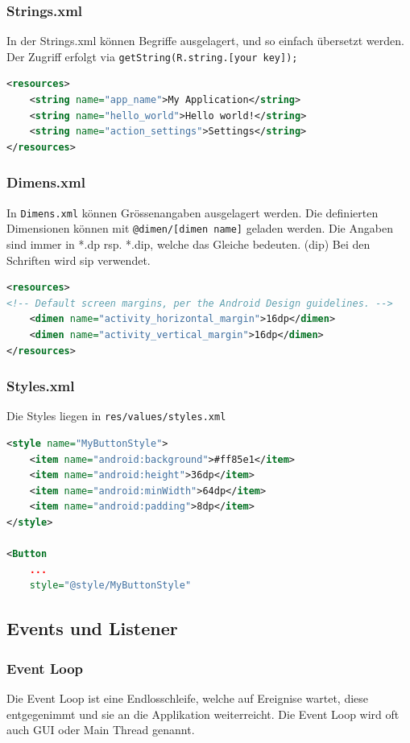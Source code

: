 \subsubsection{Strings.xml}
In der Strings.xml können Begriffe ausgelagert, und so einfach übersetzt werden. Der Zugriff erfolgt via \lstinline|getString(R.string.[your key]);|

\begin{lstlisting}[caption=strings.xml,language=xml]
<resources>
	<string name="app_name">My Application</string>
	<string name="hello_world">Hello world!</string>
	<string name="action_settings">Settings</string>
</resources>
\end{lstlisting}

\subsubsection{Dimens.xml}
In \lstinline|Dimens.xml| können Grössenangaben ausgelagert werden. Die definierten Dimensionen können mit \lstinline|@dimen/[dimen name]| geladen werden. Die Angaben sind immer in *.dp rsp. *.dip, welche das Gleiche bedeuten. (\gls{dip}) Bei den Schriften wird \gls{sip} verwendet.
\begin{lstlisting}[caption=dimens.xml, language=xml]
<resources>
<!-- Default screen margins, per the Android Design guidelines. -->
	<dimen name="activity_horizontal_margin">16dp</dimen>
	<dimen name="activity_vertical_margin">16dp</dimen>
</resources>
\end{lstlisting}

\subsubsection{Styles.xml}
Die Styles liegen in \lstinline|res/values/styles.xml|
\begin{lstlisting}[caption=styles.xml, language=xml]
<style name="MyButtonStyle">
	<item name="android:background">#ff85e1</item>
	<item name="android:height">36dp</item>
	<item name="android:minWidth">64dp</item>
	<item name="android:padding">8dp</item>
</style>

<Button
	...
	style="@style/MyButtonStyle"
\end{lstlisting}

\subsection{Events und Listener}
\subsubsection{Event Loop}
Die Event Loop ist eine Endlosschleife, welche auf Ereignise wartet, diese entgegenimmt und sie an die Applikation weiterreicht. Die Event Loop wird oft auch GUI oder Main Thread genannt.

